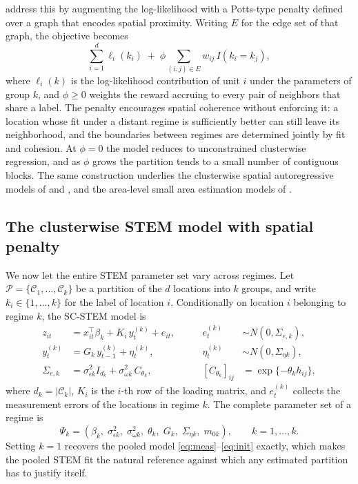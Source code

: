 \citet{SugasawaMurakami2021} address this by augmenting the log-likelihood with a Potts-type penalty \citep{potts1952some} defined over a graph that encodes spatial proximity. Writing $E$ for the edge set of that graph, the objective becomes
\begin{equation}\label{eq:potts}
  \sum_{i=1}^{d} \ell_i(k_i) \;+\; \phi \sum_{(i,j) \in E} w_{ij}\, I(k_i = k_j),
\end{equation}
where $\ell_i(k)$ is the log-likelihood contribution of unit $i$ under the parameters of group $k$, and $\phi \ge 0$ weights the reward accruing to every pair of neighbors that share a label. The penalty encourages spatial coherence without enforcing it: a location whose fit under a distant regime is sufficiently better can still leave its neighborhood, and the boundaries between regimes are determined jointly by fit and cohesion. At $\phi = 0$ the model reduces to unconstrained clusterwise regression, and as $\phi$ grows the partition tends to a small number of contiguous blocks. The same construction underlies the clusterwise spatial autoregressive models of \citet{CerquetiEtAl2025_JABES} and \citet{MaranzanoEtAl2025}, and the area-level small area estimation models of \citet{MaranzanoMatteraSugasawa2026}.

\subsection{The clusterwise STEM model with spatial penalty}\label{sec2:scstem}

We now let the entire STEM parameter set vary across regimes. Let $\mathcal{P} = \{\mathcal{C}_1,\ldots,\mathcal{C}_k\}$ be a partition of the $d$ locations into $k$ groups, and write $k_i \in \{1,\ldots,k\}$ for the label of location $i$. Conditionally on location $i$ belonging to regime $k$, the SC-STEM model is
\begin{align}
  z_{it} &= x_{it}^\top \beta_k + K_i\, y^{(k)}_t + e_{it}, \qquad
    & e^{(k)}_t &\sim N\!\left(0, \Sigma_{e,k}\right), \label{eq:scmeas}\\
  y^{(k)}_t &= G_k\, y^{(k)}_{t-1} + \eta^{(k)}_t, \qquad
    & \eta^{(k)}_t &\sim N\!\left(0, \Sigma_{\eta k}\right), \label{eq:scstate}\\
  \Sigma_{e,k} &= \sigma^2_{\epsilon k} I_{d_k} + \sigma^2_{\omega k}\, C_{\theta_k},
    \qquad & [C_{\theta_k}]_{ij} &= \exp\{-\theta_k h_{ij}\}, \label{eq:scSigma}
\end{align}
where $d_k = |\mathcal{C}_k|$, $K_i$ is the $i$-th row of the loading matrix, and $e^{(k)}_t$ collects the measurement errors of the locations in regime $k$. The complete parameter set of a regime is
\begin{equation}\label{eq:Psik}
  \Psi_k = \left(\beta_k,\; \sigma^2_{\epsilon k},\; \sigma^2_{\omega k},\;
                 \theta_k,\; G_k,\; \Sigma_{\eta k},\; m_{0k}\right),
  \qquad k = 1,\ldots,k .
\end{equation}
Setting $k=1$ recovers the pooled model \eqref{eq:meas}--\eqref{eq:init} exactly, which makes the pooled STEM fit the natural reference against which any estimated partition has to justify itself.

